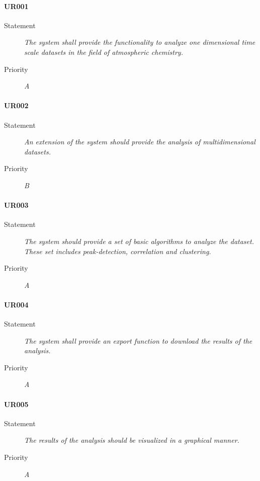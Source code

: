 \paragraph{UR001}
\begin{description}
    \item[Statement]
        \textit{The system shall provide the functionality to analyze one dimensional time scale datasets in the field of atmospheric chemistry.}
    \item [Priority] \textit{A}
\end{description}

\paragraph{UR002}
\begin{description}
    \item[Statement]
        \textit{An extension of the system should provide the analysis of multidimensional datasets.}
    \item [Priority] \textit{B}
\end{description}

\paragraph{UR003}
\begin{description}
    \item[Statement]
        \textit{The system should provide a set of basic algorithms to analyze the dataset. These set includes peak-detection, correlation and clustering.}
    \item [Priority] \textit{A}
\end{description}

\paragraph{UR004}
\begin{description}
    \item[Statement]
        \textit{The system shall provide an export function to download the results of the analysis.}
    \item [Priority] \textit{A}
\end{description}

\paragraph{UR005}
\begin{description}
    \item[Statement]
        \textit{The results of the analysis should be visualized in a graphical manner.}
    \item [Priority] \textit{A}
\end{description}

